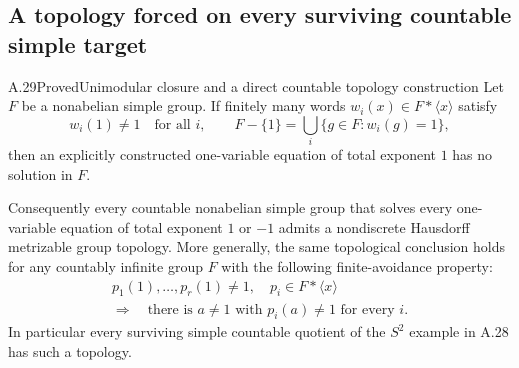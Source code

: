 \subsection{A topology forced on every surviving countable simple target}

\begin{claim}{A.29}{Proved}{Unimodular closure and a direct countable topology construction}
Let $F$ be a nonabelian simple group. If finitely many
words $w_i(x)\in F*\langle x\rangle$ satisfy
\[
 w_i(1)\ne1\quad\text{for all }i,
 \qquad
 F-\{1\}=\bigcup_i\{g\in F:w_i(g)=1\},
 \tag{A.29.1}
\]
then an explicitly constructed one-variable equation of
total exponent $1$ has no solution in $F$.

Consequently every countable nonabelian simple group that
solves every one-variable equation of total exponent
$1$ or $-1$ admits a nondiscrete Hausdorff metrizable
group topology. More generally, the same topological
conclusion holds for any countably infinite group $F$
with the following finite-avoidance property:
\[
 \begin{gathered}
 p_1(1),\ldots,p_r(1)\ne1,
 \quad p_i\in F*\langle x\rangle
 \\
 \Longrightarrow\quad
 \text{there is }a\ne1\text{ with }p_i(a)\ne1
 \text{ for every }i.
 \end{gathered}
 \tag{A.29.2}
\]
In particular every surviving simple countable quotient
of the $S^2$ example in A.28 has such a topology.
\end{claim}

